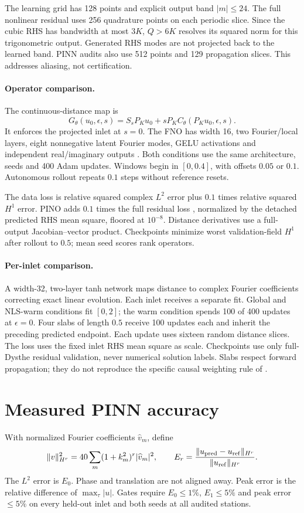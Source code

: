 \documentclass[11pt]{article}
\begin{document}
The learning grid has 128 points and explicit output band $|m|\leq24$. The full nonlinear residual uses 256 quadrature points on each periodic slice. Since the cubic RHS has bandwidth at most $3K$, $Q>6K$ resolves its squared norm for this trigonometric output. Generated RHS modes are not projected back to the learned band. PINN audits also use 512 points and 129 propagation slices. This addresses aliasing, not certification.

\paragraph{Operator comparison.}
The continuous-distance map is
\[
G_\theta(u_0,\epsilon,s)=S_sP_Ku_0+sP_KC_\theta(P_Ku_0,\epsilon,s).
\]
It enforces the projected inlet at $s=0$. The FNO has width 16, two Fourier/local layers, eight nonnegative latent Fourier modes, GELU activations and independent real/imaginary outputs \cite{fno}. Both conditions use the same architecture, seeds and 400 Adam updates. Windows begin in $[0,0.4]$, with offsets $0.05$ or $0.1$. Autonomous rollout repeats $0.1$ steps without reference resets.

The data loss is relative squared complex $L^2$ error plus $0.1$ times relative squared $H^1$ error. PINO adds $0.1$ times the full residual loss \cite{pino}, normalized by the detached predicted RHS mean square, floored at $10^{-8}$. Distance derivatives use a full-output Jacobian--vector product. Checkpoints minimize worst validation-field $H^1$ after rollout to $0.5$; mean seed scores rank operators.

\paragraph{Per-inlet comparison.}
A width-32, two-layer tanh network maps distance to complex Fourier coefficients correcting exact linear evolution. Each inlet receives a separate fit. Global and NLS-warm conditions fit $[0,2]$; the warm condition spends 100 of 400 updates at $\epsilon=0$. Four slabs of length $0.5$ receive 100 updates each and inherit the preceding predicted endpoint. Each update uses sixteen random distance slices. The loss uses the fixed inlet RHS mean square as scale. Checkpoints use only full-Dysthe residual validation, never numerical solution labels. Slabs respect forward propagation; they do not reproduce the specific causal weighting rule of \cite{causal}.

\newpage
\section{Measured PINN accuracy}
With normalized Fourier coefficients $\widehat v_m$, define
\[
\|v\|_{H^r}^2=40\sum_m(1+k_m^2)^r|\widehat v_m|^2,
\qquad E_r=\frac{\|u_{\rm pred}-u_{\rm ref}\|_{H^r}}{\|u_{\rm ref}\|_{H^r}}.
\]
The $L^2$ error is $E_0$. Phase and translation are not aligned away. Peak error is the relative difference of $\max_\tau|u|$. Gates require $E_0\leq1\%$, $E_1\leq5\%$ and peak error $\leq5\%$ on every held-out inlet and both seeds at all audited stations.
\end{document}

